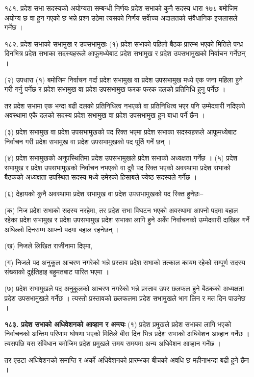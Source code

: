 १८१. प्रदेश सभा सदस्यको अयोग्यता सम्बन्धी निर्णयः प्रदेश सभाको कुनै सदस्य धारा १७८ बमोजिम अयोग्य छ वा हुन गएको छ भन्ने प्रश्न उठेमा त्यसको निर्णय सर्वाेच्च अदालतको संवैधानिक इजलासले गर्नेछ ।

१८२. प्रदेश सभाको सभामुख र उपसभामुखः (१) प्रदेश सभाको पहिलो बैठक प्रारम्भ भएको मितिले पन्ध्र दिनभित्र प्रदेश सभाका सदस्यहरूले आफूमध्येबाट प्रदेश सभामुख र प्रदेश उपसभामुखको निर्वाचन गर्नेछन् ।

(२) उपधारा (१) बमोजिम निर्वाचन गर्दा प्रदेश सभामुख वा प्रदेश उपसभामुख मध्ये एक जना महिला हुने गरी गर्नु पर्नेछ र प्रदेश सभामुख वा
प्रदेश उपसभामुख फरक फरक दलको प्रतिनिधि हुनु पर्नेछ ।

तर प्रदेश सभामा एक भन्दा बढी दलको प्रतिनिधित्व नभएको वा प्रतिनिधित्व भएर पनि उम्मेदवारी नदिएको अवस्थामा एकै दलको सदस्य
प्रदेश सभामुख वा प्रदेश उपसभामुख हुन बाधा पर्ने छैन ।

(३) प्रदेश सभामुख वा प्रदेश उपसभामुखको पद रिक्त भएमा प्रदेश सभाका सदस्यहरूले आफूमध्येबाट निर्वाचन गरी प्रदेश सभामुख वा प्रदेश उपसभामुखको पद पूर्ति गर्ने छन् ।

(४) प्रदेश सभामुखको अनुपस्थितिमा प्रदेश उपसभामुखले प्रदेश सभाको अध्यक्षता गर्नेछ ।
(५) प्रदेश सभामुख र प्रदेश उपसभामुखको निर्वाचन नभएको वा दुवै पद रिक्त भएको अवस्थामा प्रदेश सभाको बैठकको अध्यक्षता उपस्थित सदस्य मध्ये उमेरको हिसाबले ज्येष्ठ सदस्यले गर्नेछ ।

(६) देहायको कुनै अवस्थामा प्रदेश सभामुख वा प्रदेश उपसभामुखको पद रिक्त हुनेछः–

(क) निज प्रदेश सभाको सदस्य नरहेमा, तर प्रदेश सभा विघटन भएको अवस्थामा आफ्नो पदमा बहाल रहेका प्रदेश सभामुख र प्रदेश उपसभामुख प्रदेश सभाका लागि हुने अर्काे निर्वाचनको उम्मेदवारी दाखिल गर्ने अघिल्लो दिनसम्म आफ्नो पदमा बहाल रहनेछन् ।

(ख) निजले लिखित राजीनामा दिएमा,

(ग) निजले पद अनुकूल आचरण नगरेको भन्ने प्रस्ताव प्रदेश सभाको तत्काल कायम रहेको सम्पूर्ण सदस्य संख्याको
दुईतिहाइ बहुमतबाट पारित भएमा ।

(७) प्रदेश सभामुखले पद अनुकूलको आचरण नगरेको भन्ने प्रस्ताव उपर छलफल हुने बैठकको अध्यक्षता प्रदेश उपसभामुखले गर्नेछ । त्यस्तो प्रस्तावको छलफलमा प्रदेश सभामुखले भाग लिन र मत दिन पाउनेछ ।

\textbf{१८३. प्रदेश सभाको अधिवेशनको आव्हान र अन्त्यः} (१) प्रदेश प्रमुखले प्रदेश सभाका लागि भएको निर्वाचनको अन्तिम परिणाम घोषणा भएको मितिले बीस दिन भित्र प्रदेश सभाको अधिवेशन आव्हान गर्नेछ । त्यसपछि यस संविधान बमोजिम प्रदेश प्रमुखले समय समयमा अन्य अधिवेशन आव्हान गर्नेछ ।

तर एउटा अधिवेशनको समाप्ति र अर्को अधिवेशनको प्रारम्भका बीचको अवधि छ महीनाभन्दा बढी हुने छैन ।

